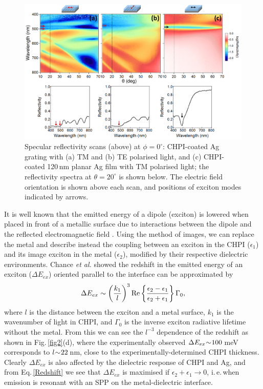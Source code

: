 \begin{figure}[ht] 
\centering    
\includegraphics[width=\textwidth]{Fig15}
\caption{Specular reflectivity scans (above) at $\phi=0^{\circ}$: CHPI-coated Ag grating with (a) TM and (b) TE polarised light, and (c) CHPI-coated 120\,nm planar Ag film with TM polarised light; the reflectivity spectra at $\theta=20^{\circ}$ is shown below. The electric field orientation is shown above each scan, and positions of exciton modes indicated by arrows.}
\label{7Fig15}
\end{figure}

It is well known that the emitted energy of a dipole (exciton) is lowered when placed in front of a metallic surface due to interactions between the dipole and the reflected electromagnetic field \cite{Morawitz1969, Morawitz1974, Chance1974, Chance1975, Chance1975a, Ford1984}. Using the method of images, we can replace the metal and describe instead the coupling between an exciton in the CHPI ($\epsilon_1$) and its image exciton in the metal ($\epsilon_2$), modified by their respective dielectric environments. Chance \textit{et al.} \cite{Chance1975} showed the redshift in the emitted energy of an exciton ($\Delta E_{ex}$) oriented parallel to the interface can be approximated by
\begin{equation}
\centering
\Delta E_{ex} \sim \left( \frac{k_1}{l} \right) ^3 \text{Re} \left\{ \frac{\epsilon_2 - \epsilon_1}{\epsilon_2 + \epsilon_1} \right\} \Gamma_0 ,
\label{Redshift}
\end{equation}
where $l$ is the distance between the exciton and a metal surface, $k_1$ is the wavenumber of light in CHPI, and $\Gamma_0$ is the inverse exciton radiative lifetime without the metal. From this we can see the $l^{-3}$ dependence of the redshift as shown in Fig.\,\ref{fig2}(d), where the experimentally observed $\Delta E_{ex} \negmedspace \sim \negmedspace 100$\,meV corresponds to $l \negmedspace \sim \negmedspace 22$\,nm, close to the experimentally-determined CHPI thickness. Clearly $\Delta E_{ex}$ is also affected by the dielectric response of CHPI and Ag, and from Eq.\,\ref{Redshift} we see that $\Delta E_{ex}$ is maximised if $\epsilon_2 + \epsilon_1 \rightarrow 0$, i.\,e.\,when emission is resonant with an SPP on the metal-dielectric interface. 

